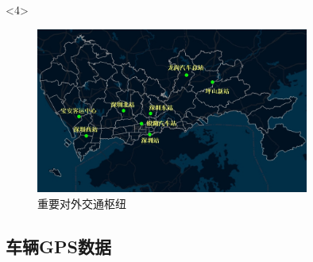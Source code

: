 \documentclass{beamerthemeMono}
\begin{document}
\begin{frame}[t]{\subsecname}
\begin{overlayarea}{\textwidth}{\textheight}
  \begin{onlyenv}<4>
\begin{figure}
  \centering
  \includegraphics[width=0.8\textwidth]{chp02_交通枢纽.jpg}
  \caption{重要对外交通枢纽}
\end{figure}
  \end{onlyenv}
\end{overlayarea}
\end{frame}

\subsection{车辆GPS数据}
\end{document}
